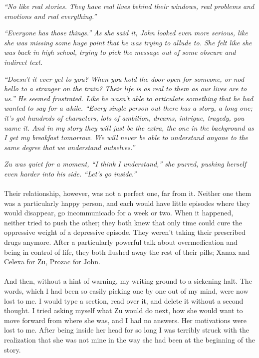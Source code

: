 \documentclass[12pt,oneside,openany]{memoir}
\begin{document}
\textit{	“No like real stories. They have real lives behind their windows, real problems and emotions and real everything.”}
	
\textit{	“Everyone has those things.” As she said it, John looked even more serious, like she was missing some huge point that he was trying to allude to. She felt like she was back in high school, trying to pick the message out of some obscure and indirect text.}
	
\textit{	“Doesn’t it ever get to you? When you hold the door open for someone, or nod hello to a stranger on the train? Their life is as real to them as our lives are to us.” He seemed frustrated. Like he wasn’t able to articulate something that he had wanted to say for a while. “Every single person out there has a story, a long one; it’s got hundreds of characters, lots of ambition, dreams, intrigue, tragedy, you name it. And in my story they will just be the extra, the one in the background as I get my breakfast tomorrow. We will never be able to understand anyone to the same degree that we understand outselves.”}
	
\textit{	Zu was quiet for a moment, “I think I understand,” she purred, pushing herself even harder into his side. “Let’s go inside.”}
\\\\	
\indent Their relationship, however, was not a perfect one, far from it. Neither one them was a particularly happy person, and each would have little episodes where they would disappear, go incommunicado for a week or two. When it happened, neither tried to push the other; they both knew that only time could cure the oppressive weight of a depressive episode. They weren’t taking their prescribed drugs anymore. After a particularly powerful talk about overmedication and being in control of life, they both flushed away the rest of their pills; Xanax and Celexa for Zu, Prozac for John. 
\\\\
\indent And then, without a hint of warning, my writing ground to a sickening halt. The words, which I had been so easily picking one by one out of my mind, were now lost to me. I would type a section, read over it, and delete it without a second thought. I tried asking myself what Zu would do next, how she would want to move forward from where she was, and I had no answers. Her motivations were lost to me. After being inside her head for so long I was terribly struck with the realization that she was not mine in the way she had been at the beginning of the story.
	
\end{document}
